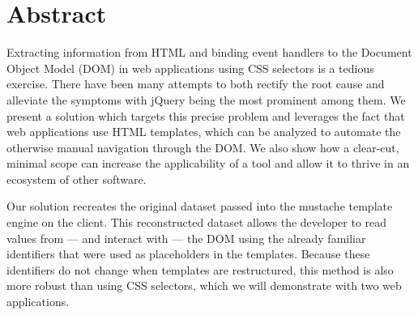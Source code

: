 \documentclass[thesis.tex]{subfiles}
\begin{document}
\chapter*{Abstract}
\label{chap:abstract}

Extracting information from HTML and binding event handlers to the
Document Object Model (DOM) in web applications using CSS selectors is a tedious
exercise. There have been many attempts to both rectify the root cause and
alleviate the symptoms with jQuery being the most prominent among them.
We present a solution which targets this precise problem and leverages the fact
that web applications use HTML templates, which can be analyzed to automate
the otherwise manual navigation through the DOM.
We also show how a clear-cut, minimal scope can increase the applicability of
a tool and allow it to thrive in an ecosystem of other software.

Our solution recreates the original dataset passed into the mustache template
engine on the client. This reconstructed dataset allows the developer
to read values from --- and interact with --- the DOM using the already familiar
identifiers that were used as placeholders in the templates.
Because these identifiers do not change when templates are restructured, this
method is also more robust than using CSS selectors, which we will demonstrate
with two web applications.
\end{document}
